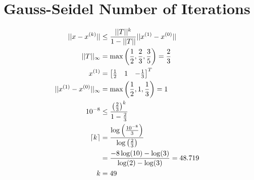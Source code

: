 \section{Gauss-Seidel Number of Iterations}

	\begin{align}
		||x-x^{(k)}|| &\leq \frac{||T||^{k}}{1-||T||}||x^{(1)}-x^{(0)}||& \\
		||T||_{\infty} &= \max \left( \frac{1}{2}, \frac{2}{3}, \frac{3}{5} \right) = \frac{2}{3}& \\
		x^{(1)} &=
		\begin{bmatrix}
			\frac{1}{2} & 1 & -\frac{1}{3}
		\end{bmatrix}^{T}& \\
		||x^{(1)}-x^{(0)}||_{\infty} &= \max \left(\frac{1}{2}, 1, \frac{1}{3}\right) = 1& \\
		10^{-8} &\leq \frac{\left( \frac{2}{3} \right)^{k}}{1-\frac{2}{3}} 
		& \notag \\
		\lceil k \rceil &=  \frac{\log\left(\frac{10^{-8}}{3}\right)}{\log\left({\frac{2}{3}}\right)}& \notag \\
		&= \frac{-8\log(10) - \log(3)}{\log(2) - \log(3)} = 48.719& \notag \\
		k &= 49&	
	\end{align}